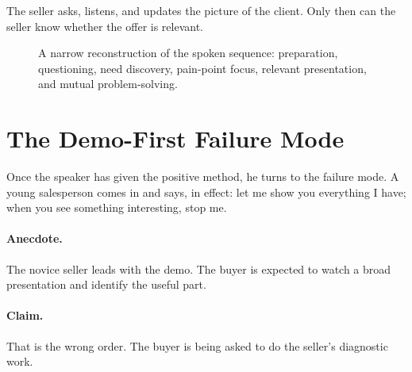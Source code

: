 The seller asks, listens, and updates the picture of the client. Only then can the seller know whether the offer is relevant.

\begin{figure}
\centering
{}
\caption{A narrow reconstruction of the spoken sequence: preparation, questioning, need discovery, pain-point focus, relevant presentation, and mutual problem-solving.}
\end{figure}

\section{The Demo-First Failure Mode}

Once the speaker has given the positive method, he turns to the failure mode. A young salesperson comes in and says, in effect: let me show you everything I have; when you see something interesting, stop me.

\paragraph{Anecdote.}
The novice seller leads with the demo. The buyer is expected to watch a broad presentation and identify the useful part.

\paragraph{Claim.}
That is the wrong order. The buyer is being asked to do the seller's diagnostic work.

